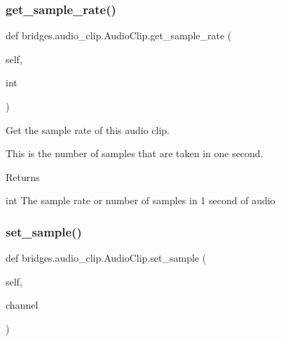 \mbox{\label{classbridges_1_1audio__clip_1_1_audio_clip_a6e9cad3d81f39b3fe811307f024fa713}} 
\subsubsection{\texorpdfstring{get\+\_\+sample\+\_\+rate()}{get\_sample\_rate()}}
{\footnotesize\ttfamily def bridges.\+audio\+\_\+clip.\+Audio\+Clip.\+get\+\_\+sample\+\_\+rate (\begin{DoxyParamCaption}\item[{}]{self,  }\item[{}]{int }\end{DoxyParamCaption})}



Get the sample rate of this audio clip. 

This is the number of samples that are taken in one second. \begin{DoxyReturn}{Returns}


int The sample rate or number of samples in 1 second of audio 
\end{DoxyReturn}
\mbox{\label{classbridges_1_1audio__clip_1_1_audio_clip_af9b9e0b615ada4a6802121f59af3da89}} 
\subsubsection{\texorpdfstring{set\+\_\+sample()}{set\_sample()}}
{\footnotesize\ttfamily def bridges.\+audio\+\_\+clip.\+Audio\+Clip.\+set\+\_\+sample (\begin{DoxyParamCaption}\item[{}]{self,  }\item[{}]{channel }\end{DoxyParamCaption})}



